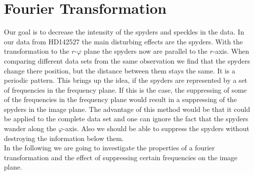 \section{Fourier Transformation}
Our goal is to decrease the intensity of the spyders and speckles in the data. In our data from HD142527 the main disturbing effects are the spyders. With the transformation to the $r$-$\varphi$ plane the spyders now are parallel to the $r$-axis. When comparing different data sets from the same observation we find that the spyders change there position, but the distance between them stays the same. It is a periodic pattern. This brings up the idea, if the spyders are represented by a set of frequencies in the frequency plane. If this is the case, the suppressing of some of the frequencies in the frequency plane would result in a suppressing of the spyders in the image plane. The advantage of this method would be that it could be applied to the complete data set and one can ignore the fact that the spyders wander along the $\varphi$-axis. Also we should be able to suppress the spyders without destroying the information below them.\\
In the following we are going to investigate the properties of a fourier transformation and the effect of suppressing certain frequencies on the image plane.\\

